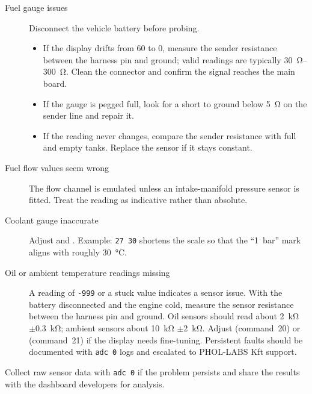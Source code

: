 \begin{description}
    \item[Fuel gauge issues] Disconnect the vehicle battery before probing.\begin{itemize}
        \item If the display drifts from 60 to 0, measure the sender resistance between the harness pin and ground; valid readings are typically \SIrange{30}{300}{\ohm}. Clean the connector and confirm the signal reaches the main board.
        \item If the gauge is pegged full, look for a short to ground below \SI{5}{\ohm} on the sender line and repair it.
        \item If the reading never changes, compare the sender resistance with full and empty tanks. Replace the sensor if it stays constant.
    \end{itemize}
    \item[Fuel flow values seem wrong] The flow channel is emulated unless an intake-manifold pressure sensor is fitted. Treat the reading as indicative rather than absolute.
    \item[Coolant gauge inaccurate] Adjust  and . Example: \verb|27 30| shortens the scale so that the ``1~bar'' mark aligns with roughly \SI{30}{\celsius}.
    \item[Oil or ambient temperature readings missing] A reading of \texttt{-999} or a stuck value indicates a sensor issue. With the battery disconnected and the engine cold, measure the sensor resistance between the harness pin and ground. Oil sensors should read about \SI{2}{\kilo\ohm} \ensuremath{\pm}\SI{0.3}{\kilo\ohm}; ambient sensors about \SI{10}{\kilo\ohm} \ensuremath{\pm}\SI{2}{\kilo\ohm}. Adjust  (command~20) or  (command~21) if the display needs fine-tuning. Persistent faults should be documented with \verb|adc 0| logs and escalated to PHOL-LABS Kft support.
\end{description}

Collect raw sensor data with \verb|adc 0| if the problem persists and share the results with the dashboard developers for analysis.
